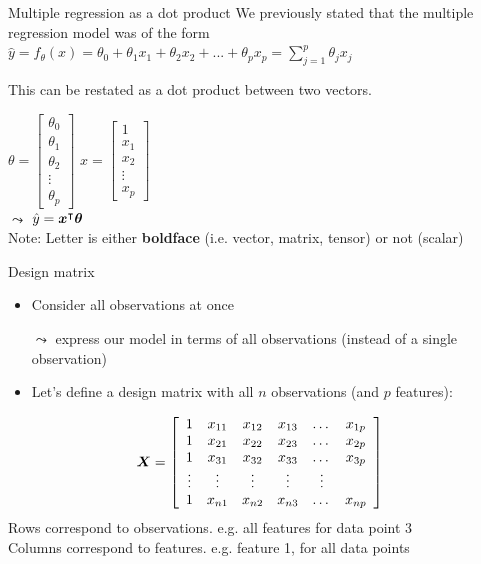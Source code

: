 \documentclass[aspectratio=169]{../latex_main/tntbeamer}  %
\begin{document}
	
	\begin{frame}{Multiple regression as a dot product}
	   We previously stated that the multiple regression model was of the form\\
        \hspace{3cm}
	    $\hat{y} = f_\theta (x) = \theta_0 + \theta_1x_1 + \theta_2x_2 + ... + \theta_px_p = \sum\limits_{j=1}^p\theta_jx_j$ 
	   
	   This can be restated as a dot product between two vectors.

	   	$\theta = \left[\begin{array}{c}
	          \theta_0\\
	          \theta_1 \\
	          \theta_2 \\
	          \vdots\\
	          \theta_p
	    \end{array}\right]$	       
	    $x = \left[\begin{array}{c}
	          1\\
	          x_1 \\
	          x_2 \\
	          \vdots\\
	          x_p
	    \end{array}\right]$	\\
	    \bigskip
	    $\leadsto$ $\hat{y} = \bm{x}^\intercal\bm{\theta}$\\[2em]
	    
	    \alert{Note}: Letter is either \textbf{boldface} (i.e. vector, matrix, tensor) or not (scalar)
	    
	\end{frame}
	
	
	\begin{frame}{Design matrix}
	\begin{itemize}
	    \item Consider all observations at once
	    \item[$\leadsto$] express our model in terms of all observations (instead of a single observation)
	    \item Let's define a design matrix with all $n$ observations (and $p$ features):
	\end{itemize}
	  \begin{align*}
	       \bm{X} = \left[\begin{array}{cccccc}
	          1 & x_{11} & x_{12} & x_{13} & \dots & x_{1p}\\
	          1 & x_{21} & x_{22} & x_{23} & \dots & x_{2p}\\
	          1 & x_{31} & x_{32} & x_{33} & \dots & x_{3p}\\
	          \vdots     & \vdots & \vdots &\vdots &  \vdots \\
	          1 & x_{n1} & x_{n2} & x_{n3} & \dots & x_{np}\\
	    \end{array}\right]
	  \end{align*}
	  Rows correspond to observations. e.g. all features for data point 3\\
	  Columns correspond to features.  e.g. feature 1, for all data points
	\end{frame}
	
\end{document}
